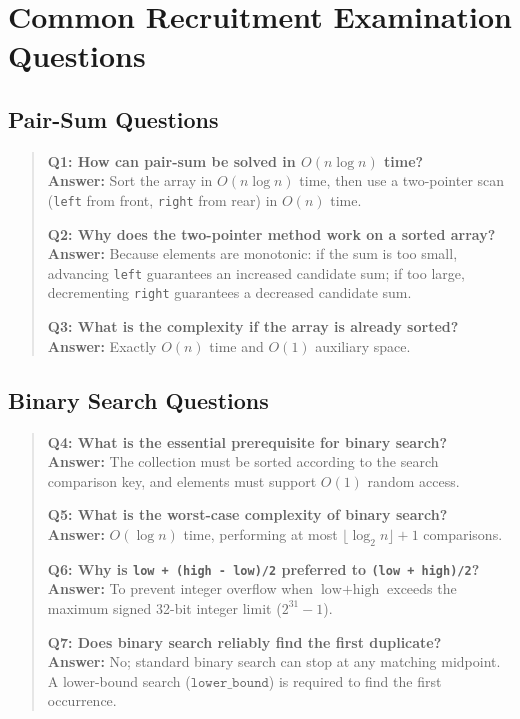 \section{Common Recruitment Examination Questions}

\subsection{Pair-Sum Questions}
\begin{quote}
\textbf{Q1: How can pair-sum be solved in $O(n \log n)$ time?}\\
\textbf{Answer:} Sort the array in $O(n \log n)$ time, then use a two-pointer scan (\texttt{left} from front, \texttt{right} from rear) in $O(n)$ time.

\textbf{Q2: Why does the two-pointer method work on a sorted array?}\\
\textbf{Answer:} Because elements are monotonic: if the sum is too small, advancing \texttt{left} guarantees an increased candidate sum; if too large, decrementing \texttt{right} guarantees a decreased candidate sum.

\textbf{Q3: What is the complexity if the array is already sorted?}\\
\textbf{Answer:} Exactly $O(n)$ time and $O(1)$ auxiliary space.
\end{quote}

\subsection{Binary Search Questions}
\begin{quote}
\textbf{Q4: What is the essential prerequisite for binary search?}\\
\textbf{Answer:} The collection must be sorted according to the search comparison key, and elements must support $O(1)$ random access.

\textbf{Q5: What is the worst-case complexity of binary search?}\\
\textbf{Answer:} $O(\log n)$ time, performing at most $\lfloor \log_2 n \rfloor + 1$ comparisons.

\textbf{Q6: Why is \texttt{low + (high - low)/2} preferred to \texttt{(low + high)/2}?}\\
\textbf{Answer:} To prevent integer overflow when $\text{low} + \text{high}$ exceeds the maximum signed 32-bit integer limit ($2^{31}-1$).

\textbf{Q7: Does binary search reliably find the first duplicate?}\\
\textbf{Answer:} No; standard binary search can stop at any matching midpoint. A lower-bound search ($\texttt{lower\_bound}$) is required to find the first occurrence.
\end{quote}

